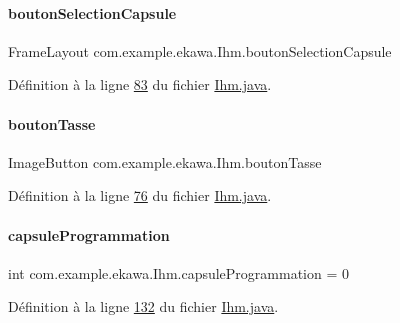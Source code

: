 \paragraph{\texorpdfstring{bouton\+Selection\+Capsule}{boutonSelectionCapsule}}
{\footnotesize\ttfamily Frame\+Layout com.\+example.\+ekawa.\+Ihm.\+bouton\+Selection\+Capsule\hspace{0.3cm}{\ttfamily [private]}}



Définition à la ligne \hyperlink{_ihm_8java_source_l00083}{83} du fichier \hyperlink{_ihm_8java_source}{Ihm.\+java}.

\mbox{\label{classcom_1_1example_1_1ekawa_1_1_ihm_a32e7322f35858a93cdfb75e06f788842}} 
\paragraph{\texorpdfstring{bouton\+Tasse}{boutonTasse}}
{\footnotesize\ttfamily Image\+Button com.\+example.\+ekawa.\+Ihm.\+bouton\+Tasse\hspace{0.3cm}{\ttfamily [private]}}



Définition à la ligne \hyperlink{_ihm_8java_source_l00076}{76} du fichier \hyperlink{_ihm_8java_source}{Ihm.\+java}.

\mbox{\label{classcom_1_1example_1_1ekawa_1_1_ihm_a2ddf5b95e2a3fbb3a15d160ba266295a}} 
\paragraph{\texorpdfstring{capsule\+Programmation}{capsuleProgrammation}}
{\footnotesize\ttfamily int com.\+example.\+ekawa.\+Ihm.\+capsule\+Programmation = 0\hspace{0.3cm}{\ttfamily [private]}}



Définition à la ligne \hyperlink{_ihm_8java_source_l00132}{132} du fichier \hyperlink{_ihm_8java_source}{Ihm.\+java}.

